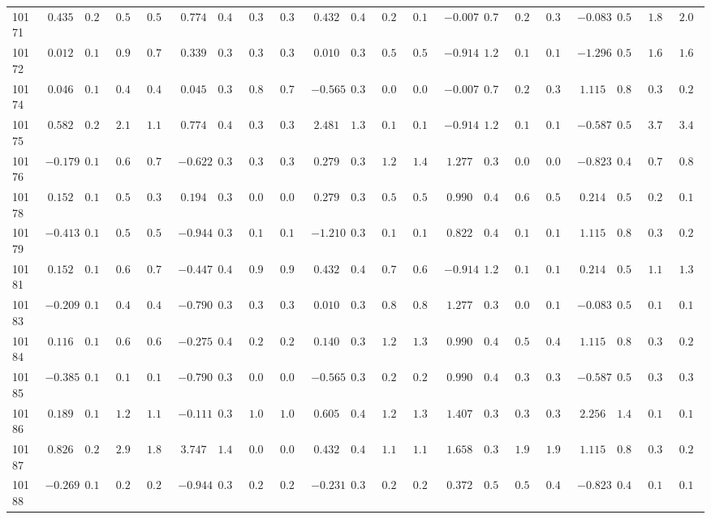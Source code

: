 \begin{landscape}
{\begin{longtable}{l|rrrr|rrrr|rrrr|rrrr|rrrr}
10171&$ 0.435$&$0.216$&$0.568$&$0.585$&$ 0.774$&$0.401$&$0.317$&$0.325$&$ 0.432$&$0.415$&$0.202$&$0.149$&$-0.007$&$0.714$&$0.299$&$0.321$&$-0.083$&$0.547$&$1.865$&$2.092$\tabularnewline
10172&$ 0.012$&$0.184$&$0.999$&$0.735$&$ 0.339$&$0.388$&$0.336$&$0.333$&$ 0.010$&$0.363$&$0.536$&$0.587$&$-0.914$&$1.254$&$0.135$&$0.149$&$-1.296$&$0.509$&$1.656$&$1.655$\tabularnewline
10174&$ 0.046$&$0.186$&$0.467$&$0.460$&$ 0.045$&$0.393$&$0.810$&$0.799$&$-0.565$&$0.334$&$0.044$&$0.045$&$-0.007$&$0.714$&$0.299$&$0.321$&$ 1.115$&$0.851$&$0.303$&$0.292$\tabularnewline
10175&$ 0.582$&$0.233$&$2.160$&$1.196$&$ 0.774$&$0.401$&$0.317$&$0.325$&$ 2.481$&$1.316$&$0.105$&$0.119$&$-0.914$&$1.254$&$0.135$&$0.149$&$-0.587$&$0.505$&$3.794$&$3.400$\tabularnewline
10176&$-0.179$&$0.176$&$0.651$&$0.702$&$-0.622$&$0.399$&$0.340$&$0.354$&$ 0.279$&$0.393$&$1.286$&$1.460$&$ 1.277$&$0.383$&$0.045$&$0.047$&$-0.823$&$0.499$&$0.796$&$0.836$\tabularnewline
10178&$ 0.152$&$0.192$&$0.554$&$0.392$&$ 0.194$&$0.389$&$0.058$&$0.058$&$ 0.279$&$0.393$&$0.537$&$0.513$&$ 0.990$&$0.414$&$0.669$&$0.586$&$ 0.214$&$0.594$&$0.256$&$0.188$\tabularnewline
10179&$-0.413$&$0.169$&$0.513$&$0.532$&$-0.944$&$0.376$&$0.155$&$0.162$&$-1.210$&$0.340$&$0.129$&$0.119$&$ 0.822$&$0.443$&$0.131$&$0.133$&$ 1.115$&$0.851$&$0.303$&$0.292$\tabularnewline
10181&$ 0.152$&$0.192$&$0.669$&$0.743$&$-0.447$&$0.403$&$0.984$&$0.992$&$ 0.432$&$0.415$&$0.764$&$0.654$&$-0.914$&$1.254$&$0.135$&$0.149$&$ 0.214$&$0.594$&$1.183$&$1.322$\tabularnewline
10183&$-0.209$&$0.175$&$0.441$&$0.436$&$-0.790$&$0.389$&$0.316$&$0.340$&$ 0.010$&$0.363$&$0.863$&$0.820$&$ 1.277$&$0.383$&$0.098$&$0.109$&$-0.083$&$0.547$&$0.104$&$0.101$\tabularnewline
10184&$ 0.116$&$0.190$&$0.662$&$0.648$&$-0.275$&$0.402$&$0.257$&$0.253$&$ 0.140$&$0.376$&$1.263$&$1.339$&$ 0.990$&$0.414$&$0.528$&$0.497$&$ 1.115$&$0.851$&$0.303$&$0.292$\tabularnewline
10185&$-0.385$&$0.170$&$0.159$&$0.141$&$-0.790$&$0.389$&$0.054$&$0.055$&$-0.565$&$0.334$&$0.295$&$0.282$&$ 0.990$&$0.414$&$0.383$&$0.393$&$-0.587$&$0.505$&$0.339$&$0.307$\tabularnewline
10186&$ 0.189$&$0.195$&$1.271$&$1.106$&$-0.111$&$0.398$&$1.043$&$1.019$&$ 0.605$&$0.448$&$1.257$&$1.383$&$ 1.407$&$0.376$&$0.389$&$0.301$&$ 2.256$&$1.456$&$0.164$&$0.191$\tabularnewline
10187&$ 0.826$&$0.269$&$2.906$&$1.891$&$ 3.747$&$1.435$&$0.083$&$0.086$&$ 0.432$&$0.415$&$1.176$&$1.163$&$ 1.658$&$0.376$&$1.921$&$1.937$&$ 1.115$&$0.851$&$0.303$&$0.292$\tabularnewline
10188&$-0.269$&$0.173$&$0.261$&$0.248$&$-0.944$&$0.376$&$0.205$&$0.205$&$-0.231$&$0.346$&$0.243$&$0.233$&$ 0.372$&$0.563$&$0.530$&$0.438$&$-0.823$&$0.499$&$0.101$&$0.100$\tabularnewline

\end{longtable}}
\end{landscape}
